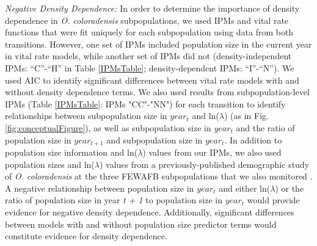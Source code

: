 \documentclass[12pt, letterpaper]{article}
\begin{document}
\textit{Negative Density Dependence:} In order to determine the importance of density dependence in \textit{O. coloradensis} subpopulations, we used IPMs and vital rate functions that were fit uniquely for each subpopulation using data from both transitions. However, one set of IPMs included population size in the current year in vital rate models, while another set of IPMs did not (density-independent IPMs: “C”-“H” in Table \ref{IPMsTable}; density-dependent IPMs: “I”-“N”). We used AIC to identify significant differences between vital rate models with and without density dependence terms. We also used results from subpopulation-level IPMs (Table \ref{IPMsTable}: IPMs "CC"-"NN") for each transition to identify relationships between subpopulation size in $year_{t}$  and ln($\lambda$) (as in Fig. \ref{fig:conceptualFigure}), as well as subpopulation size in $year_{t}$ and the ratio of population size in $year_{t+1}$ and subpopulation size in $year_{t}$. In addition to population size information and ln($\lambda$) values from our IPMs, we also used population sizes and ln($\lambda$) values from a previously-published demographic study of \textit{O. coloradensis} at the three FEWAFB subpopulations that we also monitored \cite{Floyd1998}.  A negative relationship between population size in $year_{t}$ and either ln($\lambda$) or the ratio of population size in year \textit{t + 1} to population size in $year_{t}$ would provide evidence for negative density dependence. Additionally, significant differences between models with and without population size predictor terms would constitute evidence for density dependence.  
\end{document}
